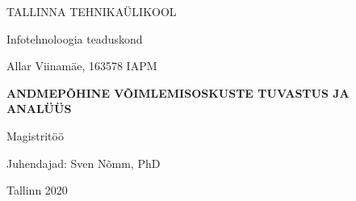 \begin{titlepage}
    \begin{center}
        \large
        TALLINNA TEHNIKAÜLIKOOL
        
        Infotehnoloogia teaduskond
        
        \vspace*{6.5cm}
        
        
         Allar Viinamäe, 163578 IAPM
        
        \vspace{0.3cm}
        
        \Large

        \textbf{ANDMEPÕHINE VÕIMLEMISOSKUSTE TUVASTUS JA ANALÜÜS}
        
        \large
        \vspace{0.3cm}
        Magistritöö
        
        \vspace{2cm}
        
        \begin{flushright}
        Juhendajad: Sven Nõmm, PhD
        \end{flushright}
        
        
        \vfill
        

        \vspace{0.8cm}
        
        Tallinn 
        2020
        
    \end{center}
\end{titlepage}